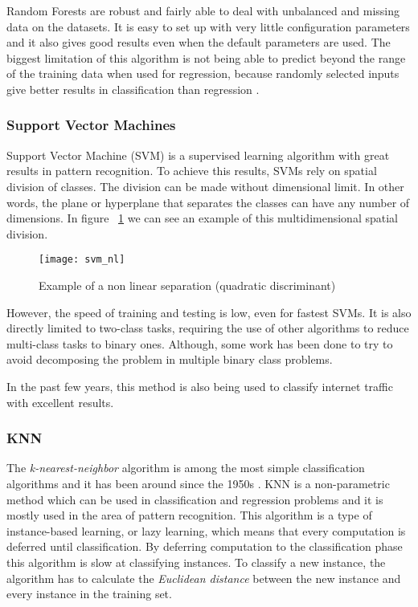 Random Forests are robust and fairly able to deal with unbalanced and missing data on the datasets. It is easy to set up with very little configuration
parameters and it also gives good results even when the default parameters are used. The biggest limitation of this algorithm is not being able to
predict beyond the range of the training data when used for regression, because randomly selected inputs give better results in classification than regression \cite{raey}.

\subsubsection{Support Vector Machines}

Support Vector Machine (SVM) is a supervised learning algorithm with great results in pattern recognition.
\cite{Cortes95support-vectornetworks} To achieve this results, SVMs rely on spatial division of classes. The division can be
made without dimensional limit. In other words, the plane or hyperplane that separates the classes can have any number of dimensions. In figure
~\ref{fig:svm_nonlin} we can see an example of this multidimensional spatial division.

\begin{figure}[h]
  \begin{center}
    \leavevmode
    \texttt{[image: svm\_nl]}
    \caption{Example of a non linear separation (quadratic discriminant)\cite{Bennett03supportvector}}
    \label{fig:svm_nonlin}
  \end{center}
\end{figure}

However, the speed of training and testing is low, even for fastest SVMs.
It is also directly limited to two-class tasks\cite{Cortes95support-vectornetworks},
requiring the use of other algorithms to reduce multi-class tasks to binary ones. Although, some work has been done to try to avoid
decomposing the problem in multiple binary class problems.\cite{Crammer:2002:AIM:944790.944813}

In the past few years, this method is also being used to classify internet traffic with excellent results.\cite{Yuan2010}


\subsubsection{KNN}

The \emph{k-nearest-neighbor} algorithm is among the most simple classification algorithms and it has been around since the 1950s \cite[p.348]{HanKam06}.
KNN is a non-parametric method which can be used in classification and regression problems and it is mostly used in the area of pattern recognition.
This algorithm is a type of instance-based learning, or lazy learning, which means that every computation is deferred until classification. By deferring 
computation to the classification phase this algorithm is slow at classifying instances. To classify a new instance, the algorithm has to calculate
the \emph{Euclidean distance} between the new instance and every instance in the training set.

